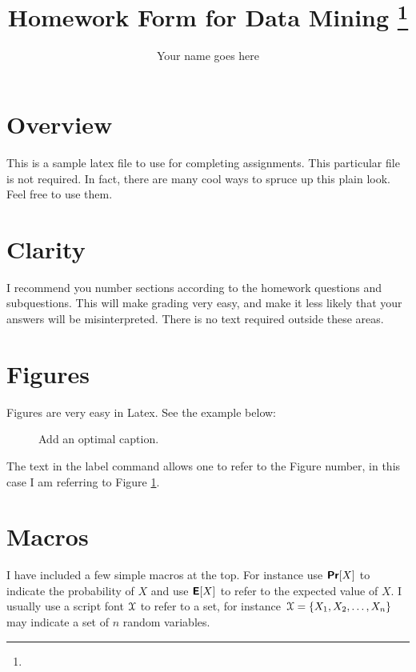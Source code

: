 \documentclass[11pt]{article}
\title{Homework Form for Data Mining
\footnote{\s{CS 6955 Data Mining; \;\; Spring 2012 \hfill
Instructor: Jeff M. Phillips, University of Utah}
}
}
\author{Your name goes here}
\renewcommand{\c}[1]{\ensuremath{\EuScript{#1}}}
\newcommand{\s}[1]{\textsf{#1}}
\newcommand{\E}{\textbf{\textsf{E}}}
\renewcommand{\Pr}{\textbf{\textsf{Pr}}}
\begin{document}
\maketitle





\section{Overview}

This is a sample latex file to use for completing assignments.  This particular file is not required.  In fact, there are many cool ways to spruce up this plain look.  Feel free to use them.  

\section{Clarity}
I recommend you number sections according to the homework questions and subquestions.  This will make grading very easy, and make it less likely that your answers will be misinterpreted.  There is no text required outside these areas.  

\section{Figures}
Figures are very easy in Latex.  See the example below:

\begin{figure}[h]
\caption{Add an optimal caption.}
\label{fig:name}
\end{figure}

The text in the \s{label} command allows one to refer to the Figure number, in this case I am referring to Figure \ref{fig:name}.  

\section{Macros}
I have included a few simple macros at the top.  For instance use $\Pr[X]$ to indicate the probability of $X$ and use $\E[X]$ to refer to the expected value of $X$.  I usually use a script font $\c{X}$ to refer to a set, for instance $\c{X} = \{X_1, X_2, \ldots, X_n\}$ may indicate a set of $n$ random variables.  
\end{document}
